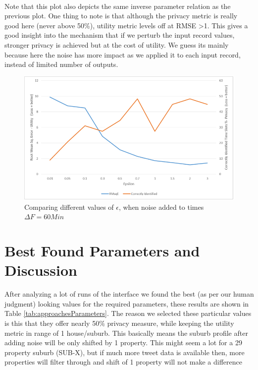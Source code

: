 \documentclass[12pt]{report}
\theoremstyle{named}
\begin{document}
\paragraph{}
Note that this plot also depicts the same inverse parameter relation as the previous plot. One thing to note is that although the privacy metric is really good here (never above 50\%), utility metric levels off at RMSE \textgreater 1. This gives a good insight into the mechanism that if we perturb the input record values, stronger privacy is achieved but at the cost of utility. We guess its mainly because here the noise has more impact as we applied it to each input record, instead of limited number of outputs.  
\begin{figure}[ht]
\centering
        \includegraphics[width=150mm,scale=1]{Images/RunWithTimes.png}
    \caption{Comparing different values of $\epsilon$, when noise added to times $\Delta F = 60 Min$}
    \label{fig:RunWithTimes}
\end{figure}



\section{Best Found Parameters and Discussion}
After analyzing a lot of runs of the interface we found the best (as per our human judgment) looking values for the required parameters, these results are shown in Table \ref{tab:approachesParameters}. The reason we selected these particular values is this that they offer nearly 50\% privacy measure, while keeping the utility metric in range of 1 house/suburb. This basically means the suburb profile after adding noise will be only shifted by 1 property. This might seem a lot for a 29 property suburb (SUB-X), but if much more tweet data is available then, more properties will filter through and shift of 1 property will not make a difference
\end{document}
